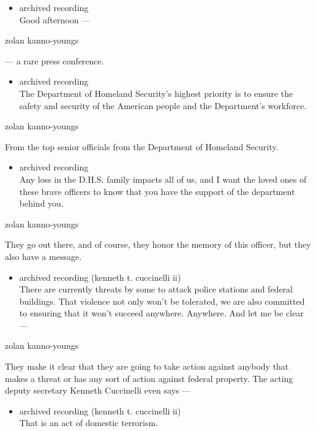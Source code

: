 \begin{itemize}
\tightlist
\item
  archived recording\\
  Good afternoon ---
\end{itemize}

zolan kanno-youngs

--- a rare press conference.

\begin{itemize}
\tightlist
\item
  archived recording\\
  The Department of Homeland Security's highest priority is to ensure
  the safety and security of the American people and the Department's
  workforce.
\end{itemize}

zolan kanno-youngs

From the top senior officials from the Department of Homeland Security.

\begin{itemize}
\tightlist
\item
  archived recording\\
  Any loss in the D.H.S. family impacts all of us, and I want the loved
  ones of these brave officers to know that you have the support of the
  department behind you.
\end{itemize}

zolan kanno-youngs

They go out there, and of course, they honor the memory of this officer,
but they also have a message.

\begin{itemize}
\tightlist
\item
  archived recording (kenneth t. cuccinelli ii)\\
  There are currently threats by some to attack police stations and
  federal buildings. That violence not only won't be tolerated, we are
  also committed to ensuring that it won't succeed anywhere. Anywhere.
  And let me be clear ---
\end{itemize}

zolan kanno-youngs

They make it clear that they are going to take action against anybody
that makes a threat or has any sort of action against federal property.
The acting deputy secretary Kenneth Cuccinelli even says ---

\begin{itemize}
\tightlist
\item
  archived recording (kenneth t. cuccinelli ii)\\
  That is an act of domestic terrorism.
\end{itemize}

